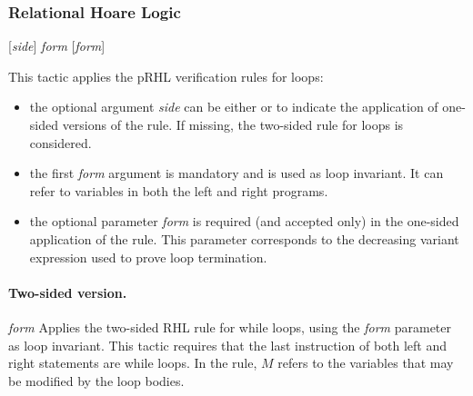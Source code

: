 


\subsubsection{Relational Hoare Logic}

\Syntax  {} [\textit{side}] \textit{form} [\textit{form}]

\Description This tactic applies the pRHL verification rules for
loops:
\begin{itemize}
\item the optional argument \textit{side} can be either  or
   to indicate the application of one-sided versions of the
  rule. If missing, the two-sided rule for loops is considered.
\item the first \textit{form} argument is mandatory and is used as
  loop invariant. It can refer to variables in both the left and right
  programs.
\item the optional parameter \textit{form} is required (and accepted
  only) in the one-sided application of the rule. This parameter
  corresponds to the decreasing variant expression used to prove loop
  termination.
\end{itemize}



\paragraph{Two-sided version.}
%
\Syntax {} \textit{form} 
%
\Description Applies the two-sided RHL rule for while loops, using the
\textit{form} parameter as loop invariant. This tactic requires that
the last instruction of both left and right statements are while loops.
In the rule, $M$ refers to the variables that may be modified by the
loop bodies.

